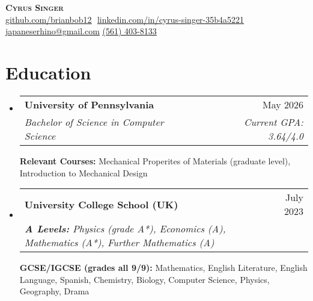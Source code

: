 \documentclass[letterpaper,11pt]{article}
\makeatletter
\newcommand{\resumeSubheading}[4]{
  \vspace{-2pt}\item
    \begin{tabular*}{0.97\textwidth}[t]{l@{\extracolsep{\fill}}r}
      \textbf{#1} & #2 \\
      \textit{\small#3} & \textit{\small #4} \\
    \end{tabular*}\vspace{-7pt}
}
\newcommand{\resumeSubHeadingListStart}{\begin{itemize}[leftmargin=0.15in, label={}]}
\newcommand{\resumeSubHeadingListEnd}{\end{itemize}}
\makeatother
\begin{document}
\hfill

\begin{center}
    \textbf{\Huge \scshape Cyrus Singer} \\ \vspace{8pt}
    \small 
    \href{https://github.com/brianbob12}{\underline{github.com/brianbob12}} $  $
    \href{https://www.linkedin.com/in/cyrus-singer-35b4a5221}{\underline{linkedin.com/in/cyrus-singer-35b4a5221}} $  $
    \href{mailto:japaneserhino@gmail.com}
    {\underline{japaneserhino@gmail.com}}
    \href{tel:561-403-8133}{\underline{(561) 403-8133}}
\end{center}

\section{Education}
  \resumeSubHeadingListStart
  
    \resumeSubheading
      {University of Pennsylvania}{May 2026}
      {Bachelor of Science in Computer Science}{Current GPA: 3.64/4.0}
      
      \vspace{5pt}

      \textbf{Relevant Courses:} \small{Mechanical Properites of Materials (graduate level), Introduction to Mechanical Design}\\

    \resumeSubheading
      {University College School \footnotesize{(UK)}}{July 2023} 
      {\textbf{A Levels:} \footnotesize{Physics (grade A*), Economics (A), Mathematics (A*), Further Mathematics (A)}}{}
      \newline
      \newline
      {\textbf{GCSE/IGCSE (grades all 9/9):} \footnotesize{Mathematics, English Literature, English Language, Spanish, Chemistry, Biology, Computer Science, Physics, Geography, Drama }}{}



  \resumeSubHeadingListEnd

\end{document}
